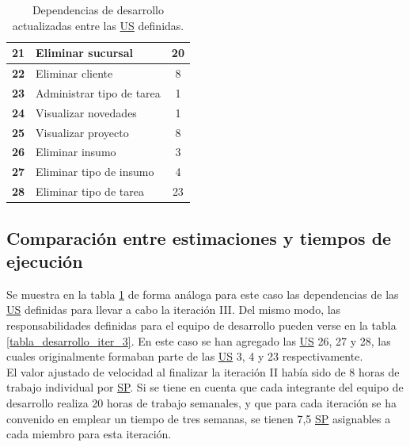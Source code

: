 \documentclass[a4paper, 12pt,twoside]{report}  %
\numberwithin{equation}{subsection} %
\begin{document}
\begin{table}[h!]
\begin{tabular}{ |p{0.5cm}|p{9cm}|c|  }
		\hline
		\textbf{21} & Eliminar sucursal & 20 \\
		\hline
		\textbf{22} & Eliminar cliente & 8 \\
		\hline
		\textbf{23} & \cellcolor{marca_US_realizada_anterior}Administrar tipo de tarea & 1 
		\\
		\hline
		\textbf{24} & \cellcolor{marca_US_realizada_anterior}Visualizar novedades & 1 
		\\
		\hline
		\textbf{25} & Visualizar proyecto & 8 
		\\
		\hline
		\textbf{26} & Eliminar insumo & 3 
		\\
		\hline
		\textbf{27} & Eliminar tipo de insumo & 4 
		\\
		\hline
		\textbf{28} & Eliminar tipo de tarea & 23 
		\\
		\hline
	\end{tabular}
	\caption{Dependencias de desarrollo actualizadas entre las \protect\hyperlink{US}{US} definidas.}
	\label{tabla_dependencias_us_it3}
\end{table}

\subsection{Comparación entre estimaciones y tiempos de ejecución}
Se muestra en la tabla \ref{tabla_dependencias_us_it3} de forma análoga para este caso las dependencias de las \hyperlink{US}{US} definidas para llevar a cabo la iteración III. Del mismo modo, las responsabilidades definidas para el equipo de desarrollo pueden verse en la tabla \ref{tabla_desarrollo_iter_3}. En este caso se han agregado las \hyperlink{US}{US} 26, 27 y 28, las cuales originalmente formaban parte de las \hyperlink{US}{US} 3, 4 y 23 respectivamente.\\
\indent El valor ajustado de velocidad al finalizar la iteración II había sido de 8 horas de trabajo individual por \hyperlink{SP}{SP}. Si se tiene en cuenta que cada integrante del equipo de desarrollo realiza 20 horas de trabajo semanales, y que para cada iteración se ha convenido en emplear un tiempo de tres semanas, se tienen 7,5 \hyperlink{SP}{SP} asignables a cada miembro para esta iteración.
\end{document}
